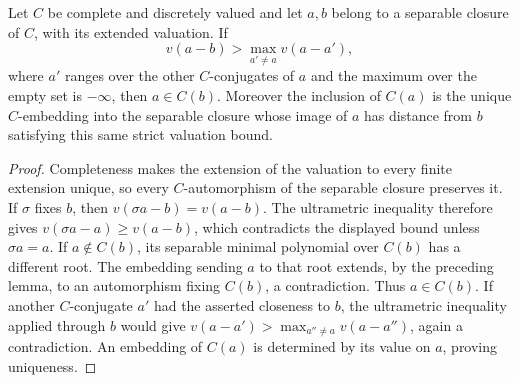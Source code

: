 \begin{lemma}
\label{fw:separable-krasner-descent}
\leanok
Let $C$ be complete and discretely valued and let $a,b$ belong to a
separable closure of $C$, with its extended valuation. If
\[
 v(a-b)>\max_{a'\ne a}v(a-a'),
\]
where $a'$ ranges over the other $C$-conjugates of $a$ and the
maximum over the empty set is $-\infty$, then $a\in C(b)$.
Moreover the inclusion of $C(a)$ is the unique $C$-embedding into the
separable closure whose image of $a$ has distance from $b$ satisfying
this same strict valuation bound.
\end{lemma}
\begin{proof}
Completeness makes the extension of the valuation to every finite
extension unique, so every $C$-automorphism of the separable closure
preserves it. If $\sigma$ fixes $b$, then
$v(\sigma a-b)=v(a-b)$. The ultrametric inequality therefore gives
$v(\sigma a-a)\geq v(a-b)$, which contradicts the displayed bound
unless $\sigma a=a$. If $a\notin C(b)$, its separable minimal
polynomial over $C(b)$ has a different root. The embedding sending
$a$ to that root extends, by the preceding lemma, to an automorphism
fixing $C(b)$, a contradiction. Thus $a\in C(b)$. If another
$C$-conjugate $a'$ had the asserted closeness to $b$, the ultrametric
inequality applied through $b$ would give
$v(a-a')>\max_{a''\ne a}v(a-a'')$, again a contradiction. An embedding
of $C(a)$ is determined by its value on $a$, proving uniqueness.
\end{proof}

